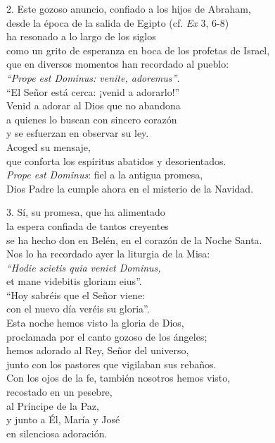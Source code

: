 2. Este gozoso anuncio, confiado a los hijos de Abraham,\\
desde la época de la salida de Egipto (cf. \emph{Ex} 3, 6-8)\\
ha resonado a lo largo de los siglos\\
como un grito de esperanza en boca de los profetas de Israel,\\
que en diversos momentos han recordado al pueblo:\\
\emph{``Prope est Dominus: venite, adoremus''}.\\
``El Señor está cerca: ¡venid a adorarlo!''\\
Venid a adorar al Dios que no abandona\\
a quienes lo buscan con sincero corazón\\
y se esfuerzan en observar su ley.\\
Acoged su mensaje,\\
que conforta los espíritus abatidos y desorientados.\\
\emph{Prope est Dominus}: fiel a la antigua promesa,\\
Dios Padre la cumple ahora en el misterio de la Navidad.

3. Sí, su promesa, que ha alimentado\\
la espera confiada de tantos creyentes\\
se ha hecho don en Belén, en el corazón de la Noche Santa.\\
Nos lo ha recordado ayer la liturgia de la Misa:\\
\emph{``Hodie scietis quia veniet Dominus,}\\
et mane videbitis gloriam eius''.\\
``Hoy sabréis que el Señor viene:\\
con el nuevo día veréis su gloria''.\\
Esta noche hemos visto la gloria de Dios,\\
proclamada por el canto gozoso de los ángeles;\\
hemos adorado al Rey, Señor del universo,\\
junto con los pastores que vigilaban sus rebaños.\\
Con los ojos de la fe, también nosotros hemos visto,\\
recostado en un pesebre,\\
al Príncipe de la Paz,\\
y junto a Él, María y José\\
en silenciosa adoración.


